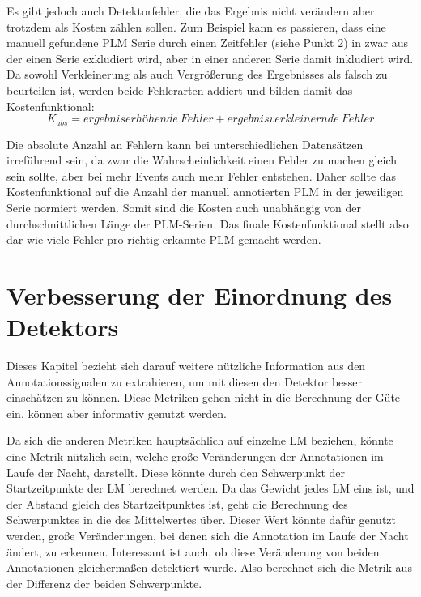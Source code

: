 Es gibt jedoch auch Detektorfehler, die das Ergebnis nicht verändern aber trotzdem als Kosten zählen sollen. Zum Beispiel kann es passieren, dass eine manuell gefundene PLM Serie durch einen Zeitfehler (siehe Punkt 2) in zwar aus der einen Serie exkludiert wird, aber in einer anderen Serie damit inkludiert wird. 
Da sowohl Verkleinerung als auch Vergrößerung des Ergebnisses als falsch zu beurteilen ist, werden beide Fehlerarten addiert und bilden damit das Kostenfunktional: 
\begin{equation}
K_{abs} = ergebniserhöhende\ Fehler + ergebnisverkleinernde\  Fehler     
\end{equation}

Die absolute Anzahl an Fehlern kann bei unterschiedlichen Datensätzen irreführend sein, da zwar die Wahrscheinlichkeit einen Fehler zu machen gleich sein sollte, aber bei mehr Events auch mehr Fehler entstehen. Daher sollte das Kostenfunktional auf die Anzahl der manuell annotierten PLM in der jeweiligen Serie normiert werden. Somit sind die Kosten auch unabhängig von der durchschnittlichen Länge der PLM-Serien. Das finale Kostenfunktional stellt also dar wie viele Fehler pro richtig erkannte PLM gemacht werden.


\section{Verbesserung der Einordnung des Detektors}\label{Verbesserung}


Dieses Kapitel bezieht sich darauf weitere nützliche Information aus den Annotationssignalen zu extrahieren, um mit diesen den Detektor besser einschätzen zu können. Diese Metriken gehen nicht in die Berechnung der Güte ein, können aber informativ genutzt werden.

Da sich die anderen Metriken hauptsächlich auf einzelne LM beziehen, könnte eine Metrik nützlich sein, welche große Veränderungen der Annotationen im Laufe der Nacht, darstellt. Diese könnte durch den Schwerpunkt der Startzeitpunkte der LM berechnet werden. Da das Gewicht jedes LM eins ist, und der Abstand gleich des Startzeitpunktes ist, geht die Berechnung des Schwerpunktes in die des Mittelwertes über.
Dieser Wert könnte dafür genutzt werden, große Veränderungen, bei denen sich die Annotation im Laufe der Nacht ändert, zu erkennen. Interessant ist auch, ob diese Veränderung von beiden Annotationen gleichermaßen detektiert wurde. Also berechnet sich die Metrik aus der Differenz der beiden Schwerpunkte.

